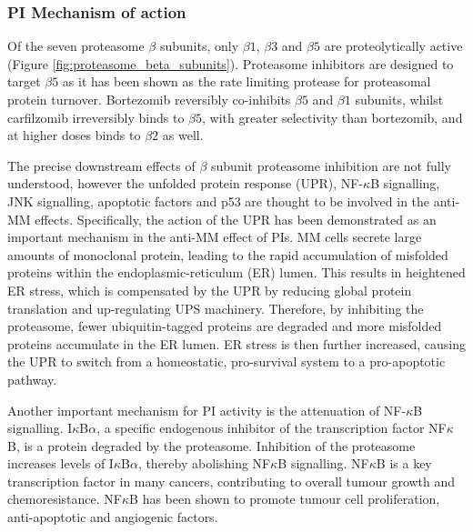 \subsubsection{PI Mechanism of action}
Of the seven proteasome $\beta$ subunits, only $\beta1$, $\beta3$ and $\beta5$ are proteolytically active (Figure \ref{fig:proteasome_beta_subunits}). Proteasome inhibitors are designed to target $\beta5$ as it has been shown as the rate limiting protease for proteasomal protein turnover\cite{besse2019proteasome}. Bortezomib reversibly co-inhibits $\beta5$ and $\beta1$ subunits, whilst carfilzomib irreversibly binds to $\beta5$, with greater selectivity than bortezomib, and at higher doses binds to $\beta2$ as well\cite{besse2019proteasome}.

The precise downstream effects of $\beta$ subunit proteasome inhibition are not fully understood, however the unfolded protein response (UPR), NF-$\kappa$B signalling, JNK signalling, apoptotic factors and p53 are thought to be involved in the anti-MM effects\cite{kubiczkova2014proteasome}.
Specifically, the action of the UPR has been demonstrated as an important mechanism in the anti-MM effect of PIs.
MM cells secrete large amounts of monoclonal protein, leading to the rapid accumulation of  misfolded proteins within the endoplasmic-reticulum (ER) lumen.
This results in heightened ER stress, which is compensated by the UPR by reducing global protein translation and up-regulating UPS machinery\cite{wallington2018resistance}.
Therefore, by inhibiting the proteasome, fewer ubiquitin-tagged proteins are degraded and more misfolded proteins accumulate in the ER lumen.
ER stress is then further increased, causing the UPR to switch from a homeostatic, pro-survival system to a pro-apoptotic pathway\cite{kubiczkova2014proteasome, wallington2018resistance}.

Another important mechanism for PI activity is the attenuation of NF-$\kappa$B signalling. I$\kappa$B$\alpha$, a specific endogenous inhibitor of the transcription factor NF$\kappa$B, is a protein degraded by the proteasome.
Inhibition of the proteasome increases levels of I$\kappa$B$\alpha$, thereby abolishing NF$\kappa$B signalling.
NF$\kappa$B is a key transcription factor in many cancers, contributing to overall tumour growth and chemoresistance.
NF$\kappa$B has been shown to promote tumour cell proliferation, anti-apoptotic and angiogenic factors\cite{kale2012molecular}.

